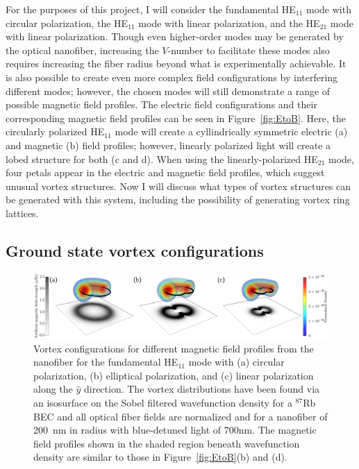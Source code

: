 For the purposes of this project, I will consider the fundamental HE$_{11}$ mode with circular polarization, the HE$_{11}$ mode with linear polarization, and the HE$_{21}$ mode with linear polarization.
Though even higher-order modes may be generated by the optical nanofiber, increasing the $V$-number to facilitate these modes also requires increasing the fiber radius beyond what is experimentally achievable.
It is also possible to create even more complex field configurations by interfering different modes; however, the chosen modes will still demonstrate a range of possible magnetic field profiles.
The electric field configurations and their corresponding magnetic field profiles can be seen in Figure~\ref{fig:EtoB}.
Here, the circularly polarized HE$_{11}$ mode will create a cyllindrically symmetric electric (a) and magnetic (b) field profiles; however, linearly polarized light will create a lobed structure for both (c and d).
When using the linearly-polarized HE$_{21}$ mode, four petals appear in the electric and magnetic field profiles, which suggest unusual vortex structures.
Now I will discuss what types of vortex structures can be generated with this system, including the possibility of generating vortex ring lattices.

\subsection{Ground state vortex configurations}

\begin{figure}[tb]
\includegraphics[width=\textwidth]{data/3d/vortex_transition.png}
\caption{Vortex configurations for different magnetic field profiles from the nanofiber for the fundamental HE$_{11}$ mode with (a) circular polarization, (b) elliptical polarization, and (c) linear polarization along the $\hat y$ direction.
The vortex distributions have been found via an isosurface on the Sobel filtered wavefunction density for a $^{87}$Rb BEC and all optical fiber fields are normalized and for a nanofiber of 200~nm in radius with blue-detuned light of 700nm.
The magnetic field profiles shown in the shaded region beneath wavefunction density are similar to those in Figure~\ref{fig:EtoB}(b) and (d).}
\label{fig:VortexRings}
\end{figure}

